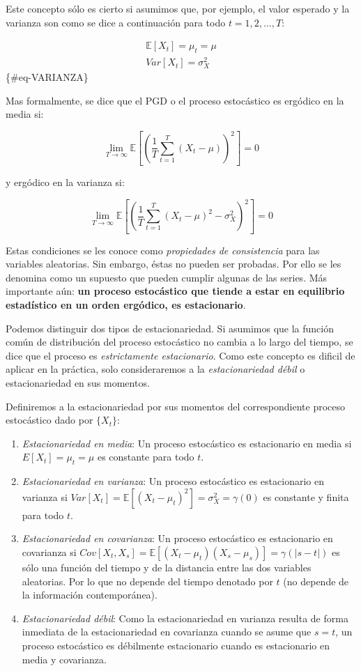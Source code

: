 \documentclass[
  a4paper,
]{article}
\begin{document}
Este concepto sólo es cierto si asumimos que, por ejemplo, el valor
esperado y la varianza son como se dice a continuación para todo
\(t = 1, 2, \ldots, T\):

\begin{eqnarray}
    \mathbb{E}[X_t] = \mu_t = \mu \\
    \label{MEDIA}
    Var[X_t] = \sigma^2_X
\end{eqnarray} \{\#eq-VARIANZA\}

Mas formalmente, se dice que el PGD o el proceso estocástico es ergódico
en la media si:

\[
\displaystyle\lim_{T \to \infty}{\mathbb{E} \left[ \left( \frac{1}{T} \sum^{T}_{t = 1} (X_t - \mu) \right) ^2 \right]} = 0
\]

y ergódico en la varianza si:

\[
\displaystyle\lim_{T \to \infty}{\mathbb{E} \left[ \left( \frac{1}{T} \sum^{T}_{t = 1} (X_t - \mu) ^2 - \sigma^2_X \right) ^2 \right]} = 0
\]

Estas condiciones se les conoce como \emph{propiedades de consistencia}
para las variables aleatorias. Sin embargo, éstas no pueden ser
probadas. Por ello se les denomina como un supuesto que pueden cumplir
algunas de las series. Más importante aún: \textbf{un proceso
estocástico que tiende a estar en equilibrio estadístico en un orden
ergódico, es estacionario}.

Podemos distinguir dos tipos de estacionariedad. Si asumimos que la
función común de distribución del proceso estocástico no cambia a lo
largo del tiempo, se dice que el proceso es \emph{estrictamente
estacionario}. Como este concepto es dificil de aplicar en la práctica,
solo consideraremos a la \emph{estacionariedad débil} o estacionariedad
en sus momentos.

Definiremos a la estacionariedad por sus momentos del correspondiente
proceso estocástico dado por \(\{X_t\}\):

\begin{enumerate}
\def\labelenumi{\arabic{enumi}.}
\item
  \emph{Estacionariedad en media}: Un proceso estocástico es
  estacionario en media si \(E[X_t] = \mu_t = \mu\) es constante para
  todo \(t\).
\item
  \emph{Estacionariedad en varianza}: Un proceso estocástico es
  estacionario en varianza si
  \(Var[X_t] = \mathbb{E}[(X_t - \mu_t)^2] = \sigma^2_X = \gamma(0)\) es
  constante y finita para todo \(t\).
\item
  \emph{Estacionariedad en covarianza}: Un proceso estocástico es
  estacionario en covarianza si
  \(Cov[X_t,X_s] = \mathbb{E}[(X_t - \mu_t)(X_s - \mu_s)] = \gamma(|s-t|)\)
  es sólo una función del tiempo y de la distancia entre las dos
  variables aleatorias. Por lo que no depende del tiempo denotado por
  \(t\) (no depende de la información contemporánea).
\item
  \emph{Estacionariedad débil}: Como la estacionariedad en varianza
  resulta de forma inmediata de la estacionariedad en covarianza cuando
  se asume que \(s = t\), un proceso estocástico es débilmente
  estacionario cuando es estacionario en media y covarianza.
\end{enumerate}
\end{document}
